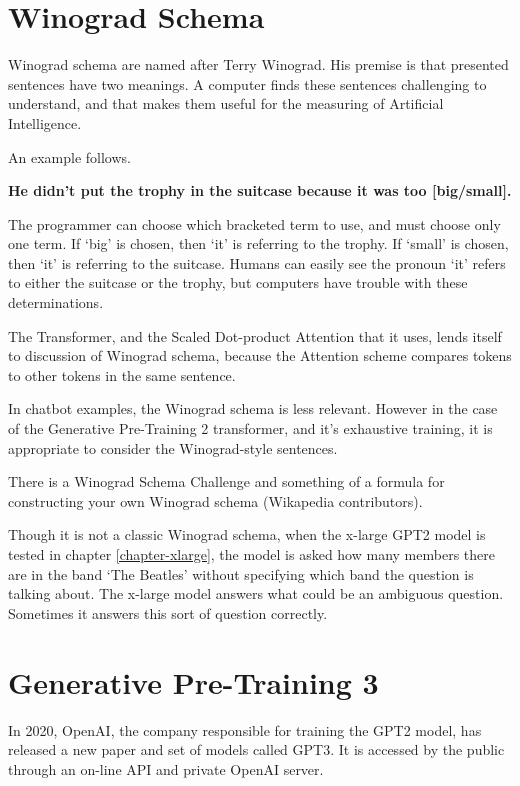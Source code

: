 \section{Winograd Schema}

Winograd schema are named after Terry Winograd. His premise is that presented sentences have two meanings. A computer finds these sentences challenging to understand, and that makes them useful for the measuring of Artificial Intelligence.

An example follows.

\begin{center}
	\textbf{He didn't put the trophy in the suitcase because it was too [big/small].}
\end{center}

The programmer can choose which bracketed term to use, and must choose only one term. If `big' is chosen, then `it' is referring to the trophy. If `small' is chosen, then `it' is referring to the suitcase. Humans can easily see the pronoun `it' refers to either the suitcase or the trophy, but computers have trouble with these determinations.

The Transformer, and the Scaled Dot-product Attention that it uses, lends itself to discussion of Winograd schema, because the Attention scheme compares tokens to other tokens in the same sentence. 

In chatbot examples, the Winograd schema is less relevant. %
However in the case of the Generative Pre-Training 2 transformer, and it's exhaustive training, it is appropriate to consider the Winograd-style sentences.

There is a Winograd Schema Challenge and something of a formula for constructing your own Winograd schema (Wikapedia contributors). \cite{wiki:xxx}

Though it is not a classic Winograd schema, when the x-large GPT2 model is tested in chapter \ref{chapter-xlarge}, the model is asked how many members there are in the band `The Beatles' without specifying which band the question is talking about. The x-large model answers what could be an ambiguous question. Sometimes it answers this sort of question correctly.

\section{Generative Pre-Training 3}

In 2020, OpenAI, the company responsible for training the GPT2 model, has released a new paper and set of models called GPT3. It is accessed by the public through an on-line API and private OpenAI server.

